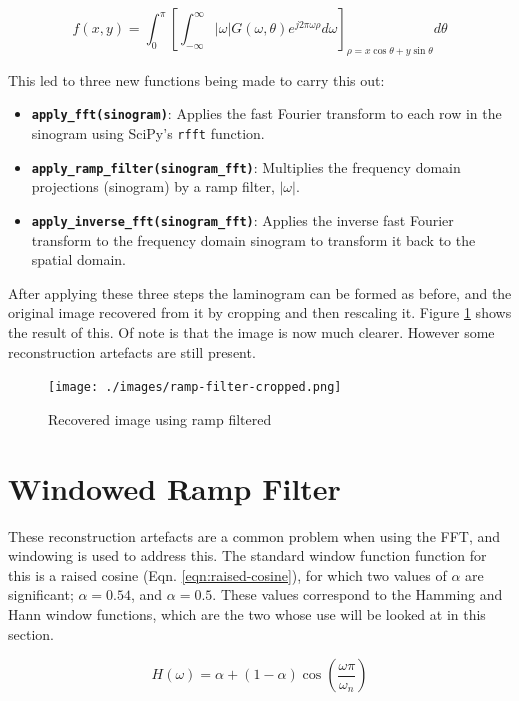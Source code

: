 \documentclass[12pt, a4paper]{article}
\begin{document}
	\begin{equation}
		f(x, y) = \int_{0}^{\pi}\left[ \int_{-\infty}^{\infty} |\omega|G(\omega, \theta) e^{j2\pi\omega\rho} d\omega \right]_{\rho=x\cos\theta + y\sin\theta} d\theta
	\label{eqn:ramp-filter}
	\end{equation}
	
	\newpage
	\noindent
	This led to three new functions being made to carry this out:
	\begin{itemize}
		\item \textbf{\texttt{apply_fft(sinogram)}}: Applies the fast Fourier transform to each row in the sinogram using SciPy's \texttt{rfft} function.
		\item \textbf{\texttt{apply_ramp_filter(sinogram_fft)}}: Multiplies the frequency domain projections (sinogram) by a ramp filter, $|\omega|$.
		\item \textbf{\texttt{apply_inverse_fft(sinogram_fft)}}: Applies the inverse fast Fourier transform to the frequency domain sinogram to transform it back to the spatial domain.
	\end{itemize}
	After applying these three steps the laminogram can be formed as before, and the original image recovered from it by cropping and then rescaling it. Figure \ref{fig:ramp-filtered-cropped} shows the result of this. Of note is that the image is now much clearer. However some reconstruction artefacts are still present.
	
	\begin{figure}[h]
		\centering
		\texttt{[image: ./images/ramp-filter-cropped.png]}
		\caption{Recovered image using ramp filtered}
		\label{fig:ramp-filtered-cropped}
	\end{figure}
	
	\section*{Windowed Ramp Filter}
	These reconstruction artefacts are a common problem when using the FFT, and windowing is used to address this. The standard window function function for this is a raised cosine (Eqn. \ref{eqn:raised-cosine}), for which two values of $\alpha$ are significant; $\alpha=0.54$, and $\alpha=0.5$. These values correspond to the Hamming and Hann window functions, which are the two whose use will be looked at in this section. 
	
	\begin{equation}
		H(\omega) = \alpha + (1 - \alpha)\cos\left(\frac{\omega\pi}{\omega_n}\right)
		\label{eqn:raised-cosine}
	\end{equation}
	
\end{document}
